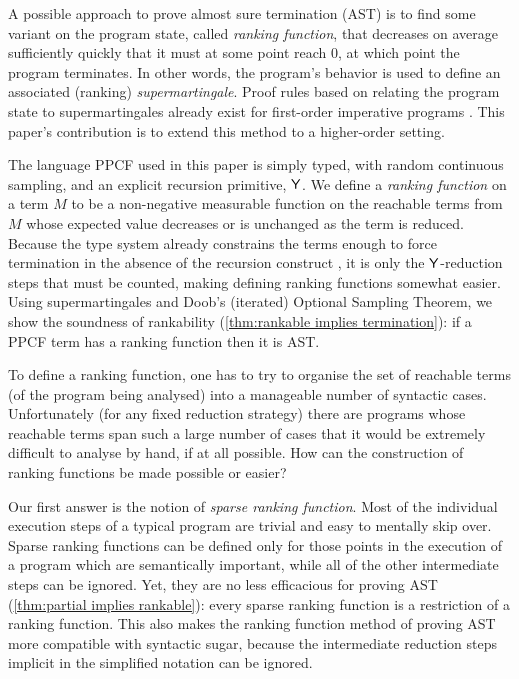A possible approach to prove almost sure termination (AST) is to find some variant on the program state, called \emph{ranking function}, that decreases on average sufficiently quickly that it must at some point reach 0, at which point the program terminates. 
In other words, the program's behavior is used to define an associated (ranking) \emph{supermartingale}. Proof rules based on relating the program state to supermartingales already exist for first-order imperative programs \cite{DBLP:conf/cav/ChakarovS13,DBLP:conf/popl/FioritiH15,DBLP:journals/pacmpl/McIverMKK18}. This paper's contribution is to extend this method to a higher-order setting.

The language PPCF used in this paper is simply typed, with random continuous sampling, and an explicit recursion primitive, $\mathsf{Y}$. 
We define a \emph{ranking function} on a term $M$ to be a non-negative measurable function on the reachable terms from $M$ whose expected value decreases or is unchanged as the term is reduced.
Because the type system already constrains the terms enough to force termination in the absence of the recursion construct \cite{tait1967,BarendregtDS2010}, it is only the $\mathsf{Y}$-reduction steps that must be counted, making defining ranking functions somewhat easier.
Using supermartingales and Doob's (iterated) Optional Sampling Theorem, we show the soundness of rankability (\cref{thm:rankable implies termination}): if a PPCF term has a ranking function then it is AST.

To define a ranking function, one has to try to organise the set of reachable terms (of the program being analysed) into a manageable number of syntactic cases. 
Unfortunately (for any fixed reduction strategy) there are programs whose reachable terms span such a large number of cases that it would be extremely difficult to analyse by hand, if at all possible. 
How can the construction of ranking functions be made possible or easier?

Our first answer is the notion of \emph{sparse ranking function}. 
Most of the individual execution steps of a typical program are trivial and easy to mentally skip over. Sparse ranking functions can be defined only for those points in the execution of a program which are semantically important, while all of the other intermediate steps can be ignored. Yet, they are no less efficacious for proving AST (\cref{thm:partial implies rankable}): every sparse ranking function is a restriction of a ranking function. This also makes the ranking function method of proving AST more compatible with syntactic sugar, because the intermediate reduction steps implicit in the simplified notation can be ignored.

